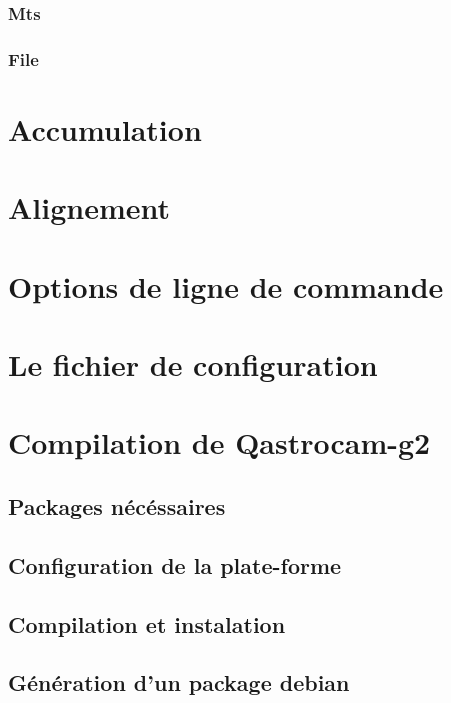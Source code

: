 \documentclass[11pt,a4paper]{book}
\begin{document}
\subsection{Mts}

\subsection{File}

\chapter{Accumulation}

\chapter{Alignement}

\chapter{Options de ligne de commande}

\chapter{Le fichier de configuration}

\appendix

\chapter{Compilation de Qastrocam-g2}

\section{Packages n\'ec\'essaires}

\section{Configuration de la plate-forme}

\section{Compilation et instalation}

\section{G\'en\'eration d'un package debian}
\end{document}
